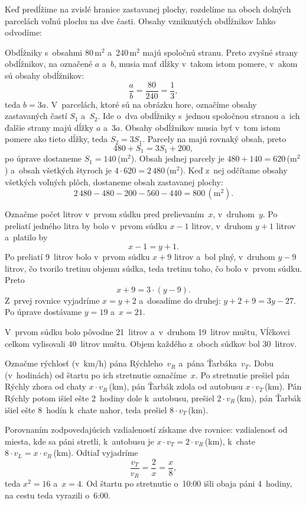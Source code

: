 {%
Keď predĺžime na  zvislé hranice zastavanej plochy, rozdelíme na oboch dolných
parcelách voľnú plochu na dve časti. Obsahy vzniknutých
obdĺžnikov ľahko odvodíme:
%

Obdĺžniky s~obsahmi 80\,m$^2$ a~240\,m$^2$ majú spoločnú stranu. Preto zvyšné strany
obdĺžnikov, na \obr{} označené $a$ a~$b$, musia mať dĺžky v~takom istom pomere,
v~akom sú obsahy obdĺžnikov:
$$
\frac{a}{b}=\frac{80}{240}=\frac13,
$$
teda $b = 3a$. V~parcelách, ktoré sú na obrázku hore, označíme obsahy
zastavaných častí $S_1$ a~$S_2$. Ide o~dva obdĺžniky s~jednou spoločnou stranou
a~ich ďalšie strany majú dĺžky $a$ a~$3a$. Obsahy obdĺžnikov musia byť v~tom istom pomere
ako tieto dĺžky, teda ${S_2 = 3S_1}$.
Parcely na  majú rovnaký obsah, preto
$$
480 + S_1= 3S_1 + 200,
$$
po úprave dostaneme $S_1 = 140$\,(m$^2$). Obsah jednej parcely je $480 + 140
= 620$\,(m$^2$) a~obsah všetkých štyroch je $4\cdot620=2\,480$\,(m$^2$).
Keď z~nej odčítame obsahy všetkých voľných plôch, dostaneme obsah zastavanej plochy:
$$
2\,480-480-200-560-440 =800\,(\text{m}^2).
$$
}

{%
Označme počet litrov v~prvom súdku pred prelievaním~$x$, v~druhom~$y$.
Po preliatí jedného litra by bolo v~prvom súdku $x-1$ litrov, v~druhom
$y+1$ litrov a~platilo by
$$
x-1 =y+1.
$$
Po preliatí 9~litrov bolo v~prvom súdku $x + 9$ litrov a~bol plný, v~druhom $y-9$ litrov,
čo tvorilo tretinu objemu súdka, teda tretinu toho, čo
bolo v~prvom súdku.
Preto
$$
x + 9 = 3\cdot(y-9).
$$
Z~prvej rovnice vyjadríme $x = y + 2$
a~dosadíme do druhej:
$y + 2 + 9 = 3y-27$.
Po úprave dostávame
$y = 19$ a~$x = 21$.

V~prvom súdku bolo pôvodne 21~litrov a~v~druhom 19~litrov muštu, Vĺčkovci celkom
vylisovali 40~litrov muštu.
Objem každého z~oboch súdkov bol 30~litrov.
}

{%
Označme rýchlosť (v~km/h) pána Rýchleho~$v_R$ a~pána Ťarbáka~$v_T$.
Dobu (v~hodinách) od štartu po ich stretnutie označíme~$x$.
Po stretnutie prešiel pán Rýchly zhora od chaty $x\cdot v_R$\,(km), pán Ťarbák zdola
od autobusu $x\cdot v_T$\,(km).
Pán Rýchly potom išiel ešte 2~hodiny dole k~autobusu, prešiel $2\cdot v_R$\,(km),
pán Ťarbák išiel ešte 8~hodín k~chate nahor, teda prešiel $8\cdot v_T$\,(km).

Porovnaním zodpovedajúcich vzdialeností získame dve rovnice:
vzdialenosť od miesta, kde sa páni stretli, k~autobusu je
$x\cdot v_T = 2\cdot v_R$\,(km),
k~chate $8\cdot v_L = {x\cdot v_R}$\,(km).
Odtiaľ vyjadríme
$$
\frac{v_T}{v_R}=\frac2x=\frac{x}8,
$$
teda $x^2 = 16$ a~$x = 4$.
Od štartu po stretnutie o~10:00 išli obaja páni 4~hodiny, na cestu teda vyrazili o~6:00.
}

